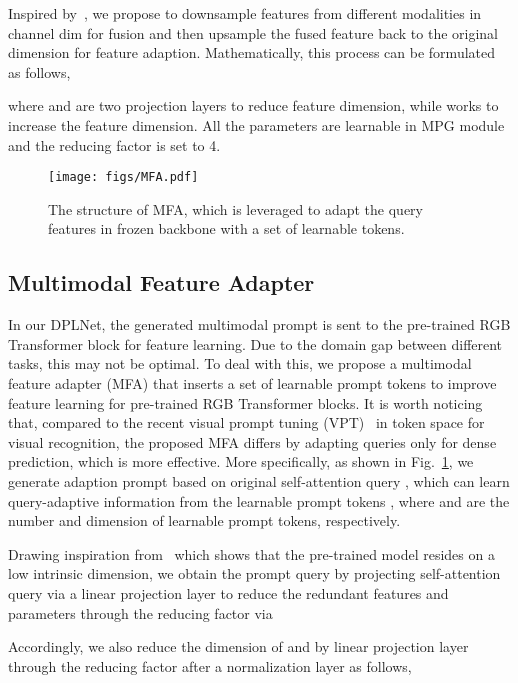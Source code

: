 \documentclass[10pt,twocolumn,letterpaper]{article}
\begin{document}
Inspired by~\cite{adaptformer}, we propose to downsample features from different modalities in channel dim for fusion and then upsample the fused feature back to the original dimension for feature adaption. Mathematically, this process can be formulated as follows,

where  and  are two projection layers to reduce feature dimension, while  works to increase the feature dimension. All the parameters are learnable in MPG module and the reducing factor  is set to 4.

\begin{figure}[t]
 \centering
 \texttt{[image: figs/MFA.pdf]}
\caption{The structure of MFA, which is leveraged to adapt the query features in frozen backbone with a set of learnable tokens.}
 \label{fig:MFA}
 \vspace{-2mm}
\end{figure}

\subsection{Multimodal Feature Adapter}
\label{mfa}
In our DPLNet, the generated multimodal prompt is sent to the pre-trained RGB Transformer block for feature learning. Due to the domain gap between different tasks, this may not be optimal. To deal with this, we propose a multimodal feature adapter (MFA) that inserts a set of learnable prompt tokens to improve feature learning for pre-trained RGB Transformer blocks. It is worth noticing that, compared to the recent visual prompt tuning (VPT)~\cite{VPT} in token space for visual recognition, the proposed MFA differs by adapting queries only for dense prediction, which is more effective. More specifically, as shown in Fig.~\ref{fig:MFA}, we generate adaption prompt  based on original self-attention query , which can learn query-adaptive information from the learnable prompt tokens , where  and  are the number and dimension of learnable prompt tokens, respectively. 

Drawing inspiration from~\cite{LORA} which shows that the pre-trained model resides on a low intrinsic dimension, we obtain the prompt query {} by projecting self-attention query  via a linear projection layer to reduce the redundant features and parameters through the reducing factor  via

Accordingly, we also reduce the dimension of {} and {} by linear projection layer through the reducing factor  after a normalization layer as follows,
\end{document}
